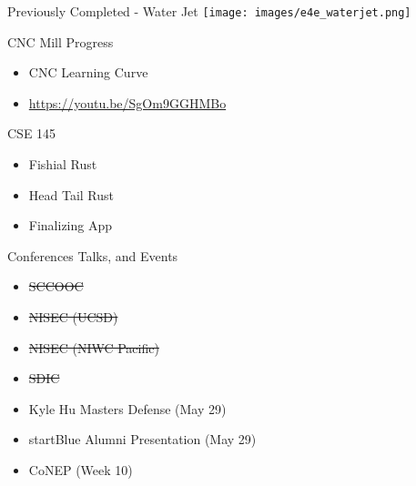 \begin{frame}{Previously Completed - Water Jet}
    \centering
    \texttt{[image: images/e4e\_waterjet.png]}
\end{frame}

\begin{frame}{CNC Mill Progress}
    \begin{itemize}
        \item CNC Learning Curve
        \item{\url{https://youtu.be/SgOm9GGHMBo}}
    \end{itemize}
\end{frame}

\begin{frame}{CSE 145}
    \begin{itemize}
        \item Fishial Rust
        \item Head Tail Rust
        \item Finalizing App
    \end{itemize}
\end{frame}

\begin{frame}{Conferences Talks, and Events}
    \begin{itemize}
        \item \sout{SCCOOC}
        \item \sout{NISEC (UCSD)}
        \item \sout{NISEC (NIWC Pacific)}
        \item \sout{SDIC}
        \item Kyle Hu Masters Defense (May 29)
        \item startBlue Alumni Presentation (May 29)
        \item CoNEP (Week 10)
    \end{itemize}
\end{frame}
